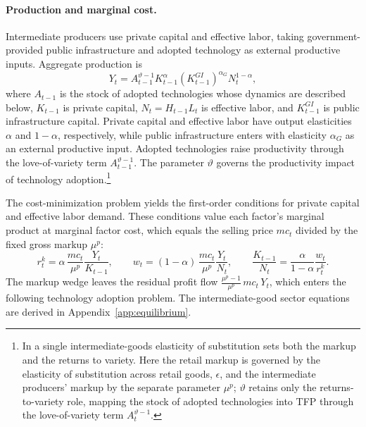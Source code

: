 \documentclass[a4paper,11pt]{article}
\begin{document}
\paragraph{Production and marginal cost.}
Intermediate producers use private capital and effective labor, taking government-provided public infrastructure and adopted technology as external productive inputs.
Aggregate production is
\begin{equation} \label{eq:production}
    Y_t = A_{t-1}^{\vartheta-1} K_{t-1}^{\alpha} \left(K_{t-1}^{GI}\right)^{\alpha_G} N_t^{1-\alpha},
\end{equation}
where $A_{t-1}$ is the stock of adopted technologies whose dynamics are described below, $K_{t-1}$ is private capital, $N_t = H_{t-1}L_t$ is effective labor, and $K_{t-1}^{GI}$ is public infrastructure capital.
Private capital and effective labor have output elasticities $\alpha$ and $1-\alpha$, respectively, while public infrastructure enters with elasticity $\alpha_G$ as an external productive input.
Adopted technologies raise productivity through the love-of-variety term $A_{t-1}^{\vartheta-1}$.
The parameter $\vartheta$ governs the productivity impact of technology adoption.\footnote{In \citet{Anzoateguietal2019} a single intermediate-goods elasticity of substitution sets both the markup and the returns to variety.
Here the retail markup is governed by the elasticity of substitution across retail goods, $\epsilon$, and the intermediate producers' markup by the separate parameter $\mu^{p}$; $\vartheta$ retains only the returns-to-variety role, mapping the stock of adopted technologies into TFP through the love-of-variety term $A_t^{\vartheta-1}$.}

The cost-minimization problem yields the first-order conditions for private capital and effective labor demand.
These conditions value each factor's marginal product at marginal factor cost, which equals the selling price $mc_t$ divided by the fixed gross markup $\mu^{p}$:
\begin{equation} \label{eq:factordemand}
    r_t^{k} = \alpha\, \frac{mc_t}{\mu^{p}} \frac{Y_t}{K_{t-1}}, \qquad w_t = (1-\alpha)\, \frac{mc_t}{\mu^{p}} \frac{Y_t}{N_t}, \qquad \frac{K_{t-1}}{N_t} = \frac{\alpha}{1-\alpha}\frac{w_t}{r_t^{k}}.
\end{equation}
The markup wedge leaves the residual profit flow $\frac{\mu^{p}-1}{\mu^{p}}\, mc_t\, Y_t$, which enters the following technology adoption problem.
The intermediate-good sector equations are derived in Appendix~\ref{app:equilibrium}.
\end{document}

